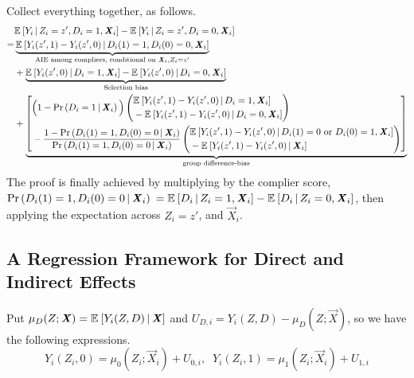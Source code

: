 Collect everything together, as follows.
\begin{align*}
    &  \mathbb{E}_{} \left[ Y_i \, \middle\vert \, Z_i = z', D_i = 1, \boldsymbol{\mathit{X}}_i \right]
    - \mathbb{E}_{} \left[ Y_i \, \middle\vert \, Z_i = z', D_i = 0, \boldsymbol{\mathit{X}}_i \right] \\
    =& \underbrace{
        \mathbb{E}_{} \left[ Y_i(z', 1) - Y_i(z', 0) \, \middle\vert \, D_i(1) =1, D_i(0)=0,\boldsymbol{\mathit{X}}_i \right]}_{
            \text{AIE among compliers, conditional on }\boldsymbol{\mathit{X}}_i, Z_i = z'} \\
    &+ \underbrace{
        \mathbb{E}_{} \left[ Y_i(z', 0) \, \middle\vert \, D_i = 1, \boldsymbol{\mathit{X}}_i \right]
            - \mathbb{E}_{} \left[ Y_i(z', 0) \, \middle\vert \, D_i = 0, \boldsymbol{\mathit{X}}_i \right]}_{
                \text{Selection bias}} \\
    &+ \underbrace{\left[ \begin{aligned}
        &\Big( 1 - \Pr\left( D_i = 1 \, \middle\vert \, \boldsymbol{\mathit{X}}_i \right) \Big)
        \left( \begin{aligned}
            &\mathbb{E}_{} \left[ Y_i(z', 1) - Y_i(z', 0) \, \middle\vert \, D_i = 1, \boldsymbol{\mathit{X}}_i \right] \\ 
            &  - \mathbb{E}_{} \left[ Y_i(z', 1) - Y_i(z', 0) \, \middle\vert \, D_i = 0, \boldsymbol{\mathit{X}}_i \right]
        \end{aligned} \right) \\
        &- \frac{1 - \Pr\left( D_i(1) = 1, D_i(0) = 0 \, \middle\vert \, \boldsymbol{\mathit{X}}_i \right) }{
            \Pr\left( D_i(1) = 1, D_i(0) = 0 \, \middle\vert \, \boldsymbol{\mathit{X}}_i \right)} 
        \left( \begin{aligned}
            &\mathbb{E}_{} \left[ Y_i(z', 1) - Y_i(z', 0) \, \middle\vert \, D_i(1) = 0 \text{ or } D_i(0)=1, \boldsymbol{\mathit{X}}_i \right] \\ 
            &  - \mathbb{E}_{} \left[ Y_i(z', 1) - Y_i(z', 0) \, \middle\vert \, \boldsymbol{\mathit{X}}_i \right]
        \end{aligned} \right)
    \end{aligned} \right] }_{
        \text{group difference-bias}}
\end{align*}
The proof is finally achieved by multiplying by the complier score, 
$\Pr\left( D_i(1) = 1, D_i(0) = 0 \, \middle\vert \, \boldsymbol{\mathit{X}}_i \right)$
$= \mathbb{E}_{} \left[ D_i \, \middle\vert \, Z_i = 1, \boldsymbol{\mathit{X}}_i \right] - \mathbb{E}_{} \left[ D_i \, \middle\vert \, Z_i = 0, \boldsymbol{\mathit{X}}_i \right]$,
then applying the expectation across $Z_i = z'$, and $\vec X_i$.

\subsection{A Regression Framework for Direct and Indirect Effects}
\label{appendix:regression-model}
Put $\mu_{D}(Z; \boldsymbol{\mathit{X}}) = \mathbb{E}_{} \left[ Y_i(Z, D) \, \middle\vert \, \boldsymbol{\mathit{X}} \right]$ and $U_{D, i} = Y_i(Z,D) - \mu_D(Z; \vec X)$, so we have the following expressions.
\[ Y_i(Z_i, 0)
        = \mu_{0}(Z_i; \vec X_i) + U_{0,i}, \;\;
    Y_i(Z_i, 1)
        = \mu_{1}(Z_i; \vec X_i) + U_{1,i} \]

